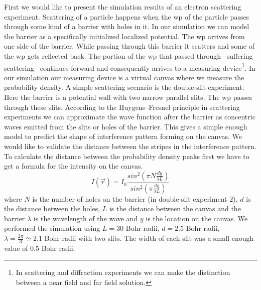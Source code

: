 First we would like to present the simulation results of an electron scattering experiment.
Scattering of a particle happens when the \acrshort{wp} of the particle passes through some kind of a barrier with holes in it.
In our simulation we can model the barrier as a specifically initialized localized potential.
The \acrshort{wp} arrives from one side of the barrier.
While passing through this barrier it scatters and some of the \acrshort{wp} gets reflected back.
The portion of the \acrshort{wp} that passed through --suffering scattering-- continues forward and consequently arrives to a measuring device\footnote{In scattering and diffraction experiments we can make the distinction between a near field and far field solution.}.
In our simulation our measuring device is a virtual canvas where we measure the probability density.
A simple scattering scenario is the double-slit experiment.
Here the barrier is a potential wall with two narrow parallel slits.
The \acrshort{wp} passes through these slits.
According to the Huygens–Fresnel principle in scattering experiments we can approximate the wave function after the barrier as concentric waves emitted from the slits or holes of the barrier.
This gives a simple enough model to predict the shape of interference pattern forming on the canvas.
We would like to validate the distance between the stripes in the interference pattern.
To calculate the distance between the probability density peaks first we have to get a formula for the intensity on the canvas.
\begin{equation}
	\label{eq:Huygens}
	I(\vec{r}) = I_0 \frac{sin^2\left( \pi N \frac{dy}{\lambda L} \right)}{sin^2\left( \pi \frac{dy}{\lambda L} \right)}
\end{equation}
where $N$ is the number of holes on the barrier (in double-slit experiment $2$), $d$ is the distance between the holes, $L$ is the distance between the canvas and the barrier $\lambda$ is the wavelength of the wave and $y$ is the location on the canvas.
We performed the simulation using $L = 30$ Bohr radii, $d = 2.5$ Bohr radii, $\lambda = \frac{2\pi}{3}\simeq 2.1$ Bohr radii with two slits.
The width of each slit was a small enough value of $0.5$ Bohr radii.
